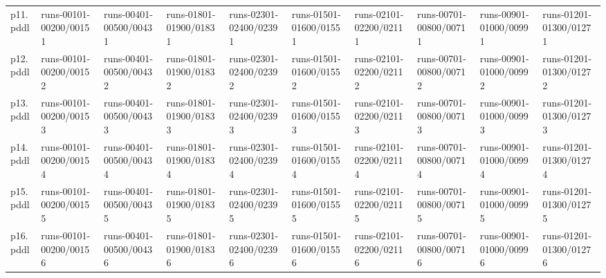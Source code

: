 \documentclass{article}
\begin{document}
\begin{tabular}{@{}lrrrrrrrrr@{}}
p11.pddl & \multicolumn{1}{|l|}{runs-00101-00200/00151} & \multicolumn{1}{|l|}{runs-00401-00500/00431} & \multicolumn{1}{|l|}{runs-01801-01900/01831} & \multicolumn{1}{|l|}{runs-02301-02400/02391} & \multicolumn{1}{|l|}{runs-01501-01600/01551} & \multicolumn{1}{|l|}{runs-02101-02200/02111} & \multicolumn{1}{|l|}{runs-00701-00800/00711} & \multicolumn{1}{|l|}{runs-00901-01000/00991} & \multicolumn{1}{|l|}{runs-01201-01300/01271} \\
p12.pddl & \multicolumn{1}{|l|}{runs-00101-00200/00152} & \multicolumn{1}{|l|}{runs-00401-00500/00432} & \multicolumn{1}{|l|}{runs-01801-01900/01832} & \multicolumn{1}{|l|}{runs-02301-02400/02392} & \multicolumn{1}{|l|}{runs-01501-01600/01552} & \multicolumn{1}{|l|}{runs-02101-02200/02112} & \multicolumn{1}{|l|}{runs-00701-00800/00712} & \multicolumn{1}{|l|}{runs-00901-01000/00992} & \multicolumn{1}{|l|}{runs-01201-01300/01272} \\
p13.pddl & \multicolumn{1}{|l|}{runs-00101-00200/00153} & \multicolumn{1}{|l|}{runs-00401-00500/00433} & \multicolumn{1}{|l|}{runs-01801-01900/01833} & \multicolumn{1}{|l|}{runs-02301-02400/02393} & \multicolumn{1}{|l|}{runs-01501-01600/01553} & \multicolumn{1}{|l|}{runs-02101-02200/02113} & \multicolumn{1}{|l|}{runs-00701-00800/00713} & \multicolumn{1}{|l|}{runs-00901-01000/00993} & \multicolumn{1}{|l|}{runs-01201-01300/01273} \\
p14.pddl & \multicolumn{1}{|l|}{runs-00101-00200/00154} & \multicolumn{1}{|l|}{runs-00401-00500/00434} & \multicolumn{1}{|l|}{runs-01801-01900/01834} & \multicolumn{1}{|l|}{runs-02301-02400/02394} & \multicolumn{1}{|l|}{runs-01501-01600/01554} & \multicolumn{1}{|l|}{runs-02101-02200/02114} & \multicolumn{1}{|l|}{runs-00701-00800/00714} & \multicolumn{1}{|l|}{runs-00901-01000/00994} & \multicolumn{1}{|l|}{runs-01201-01300/01274} \\
p15.pddl & \multicolumn{1}{|l|}{runs-00101-00200/00155} & \multicolumn{1}{|l|}{runs-00401-00500/00435} & \multicolumn{1}{|l|}{runs-01801-01900/01835} & \multicolumn{1}{|l|}{runs-02301-02400/02395} & \multicolumn{1}{|l|}{runs-01501-01600/01555} & \multicolumn{1}{|l|}{runs-02101-02200/02115} & \multicolumn{1}{|l|}{runs-00701-00800/00715} & \multicolumn{1}{|l|}{runs-00901-01000/00995} & \multicolumn{1}{|l|}{runs-01201-01300/01275} \\
p16.pddl & \multicolumn{1}{|l|}{runs-00101-00200/00156} & \multicolumn{1}{|l|}{runs-00401-00500/00436} & \multicolumn{1}{|l|}{runs-01801-01900/01836} & \multicolumn{1}{|l|}{runs-02301-02400/02396} & \multicolumn{1}{|l|}{runs-01501-01600/01556} & \multicolumn{1}{|l|}{runs-02101-02200/02116} & \multicolumn{1}{|l|}{runs-00701-00800/00716} & \multicolumn{1}{|l|}{runs-00901-01000/00996} & \multicolumn{1}{|l|}{runs-01201-01300/01276} \\

\end{tabular}
\end{document}
